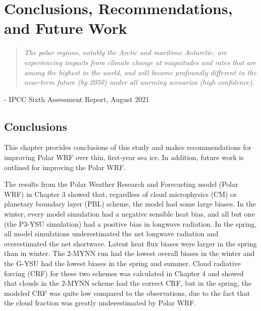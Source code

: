 \chapter{Conclusions, Recommendations, and Future Work}
\vspace{1 cm}
\begin{spacing}{1} \begin{quote} 
\noindent \emph{The polar regions, notably the Arctic and maritime Antarctic, are experiencing impacts from climate change at magnitudes and rates that are among the highest in the world, and will become profoundly different in the near-term future (by 2050) under all warming scenarios (high confidence).}\end{quote}
\hspace{6 cm} - IPCC Sixth Assessment Report, August 2021  
\end{spacing}
\doublespacing
\section{Conclusions}

This chapter provides conclusions of this study and makes recommendations for improving Polar WRF over thin, first-year sea ice. In addition, future work is outlined for improving the Polar WRF. 

The results from the Polar Weather Research and Forecasting model (Polar WRF) in Chapter 3 showed that, regardless of cloud microphysics (CM) or planetary boundary layer (PBL) scheme, the model had some large biases. In the winter, every model simulation had a negative sensible heat bias, and all but one (the P3-YSU simulation) had a positive bias in longwave radiation. In the spring, all model simulations underestimated the net longwave radiation and overestimated the net shortwave. Latent heat flux biases were larger in the spring than in winter. The 2-MYNN run had the lowest overall biases in the winter and the G-YSU had the lowest biases in the spring and summer. Cloud radiative forcing (CRF) for these two schemes was calculated in Chapter 4 and showed that clouds in the 2-MYNN scheme had the correct CRF, but in the spring, the modeled CRF was quite low compared to the observations, due to the fact that the cloud fraction was greatly underestimated by Polar WRF.

